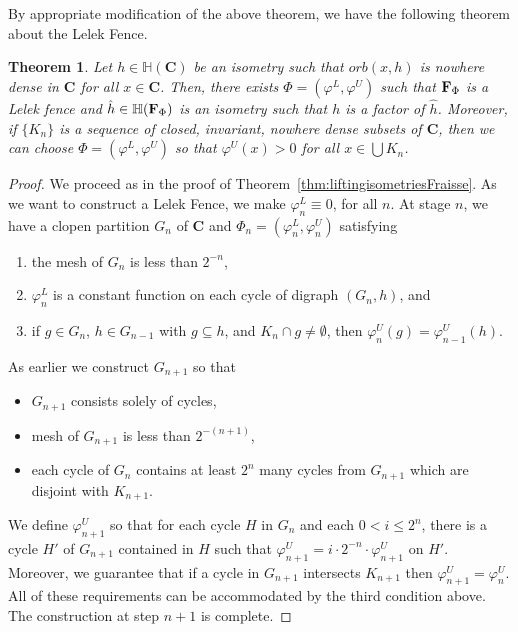 \documentclass[11pt]{amsart}
\newtheorem{theorem}{Theorem}[section]
\newcommand{\cantor}{\mathbf C}
\newcommand{\fence}{{\bf F}_{\Phi}{}}
\newcommand{\groupcantor}{{\mathbb H}(\cantor)}
\newcommand{\groupfence}{{\mathbb{H}(\fence)}}
\begin{document}
{By appropriate modification of the above theorem, we have the following theorem about the Lelek Fence.
\begin{theorem}\label{thm:liftingisometriesLelek}
Let $h \in \groupcantor$ be an isometry such that $orb(x,h)$ is nowhere dense in $\cantor$ for all $x \in \cantor$. Then, there exists $\Phi = (\varphi^L, \varphi^U)$ such that $\fence$ is a Lelek fence and $\hat{h} \in \groupfence$ is an isometry such that $h$ is a factor of $\hat{h}$. Moreover, if $\{K_n\}$ is a sequence of closed, invariant, nowhere dense subsets of $\cantor$, then we can choose $\Phi = (\varphi^L, \varphi^U)$ so that $\varphi^U (x) >0$ for all $ x \in \bigcup K_n$.
\end{theorem}
\begin{proof}
We proceed as in the proof of Theorem~\ref{thm:liftingisometriesFraisse}. As we want to construct a Lelek Fence, we make $\varphi_n^L \equiv 0$, for all $n$. At stage $n$, we have a clopen partition $G_n$ of $\cantor$ and $\Phi_n = (\varphi^L_n, \varphi^U_n)$ satisfying 
\begin{enumerate}[label=\alph*)]
    \item the mesh of $G_n$ is less than $2^{-n}$,
     \item  $\varphi_n^L$ is a constant function on each cycle of digraph $(G_n,h)$, and 
     \item if $g \in G_n$, $h \in G_{n-1}$ with $g \subseteq h$, and $K_n \cap g \neq \emptyset$, then $\varphi^U_n(g) = \varphi^U_{n-1}(h)$.
     \end{enumerate}
     As earlier we construct $G_{n+1}$ so that 
     \begin{itemize}
     \item $G_{n+1}$ consists solely of cycles,
     \item mesh of $G_{n+1}$ is less than $2^{-(n+1)}$,
     \item each cycle of $G_n$ contains at least $2^{n}$ many cycles from $G_{n+1}$ which are disjoint with $K_{n+1}$.
 \end{itemize} 
 We define  $\varphi_{n+1}^U$ so that for each cycle $H$ in $G_n$ and each $0 < i \le 2^n$, there is a cycle $H'$ of $G_{n+1}$ contained in $H$ 
 such that $\varphi_{n+1}^U  = i \cdot 2^{-n} \cdot \varphi_{n+1}^U$ on $H'$. Moreover,
 we guarantee that if a cycle in $G_{n+1}$ intersects $K_{n+1}$ then $\varphi_{n+1}^U = \varphi_{n}^U$. All of these requirements can be accommodated by the third condition above. The construction at step $n+1$ is complete. 


\end{proof}}
\end{document}
